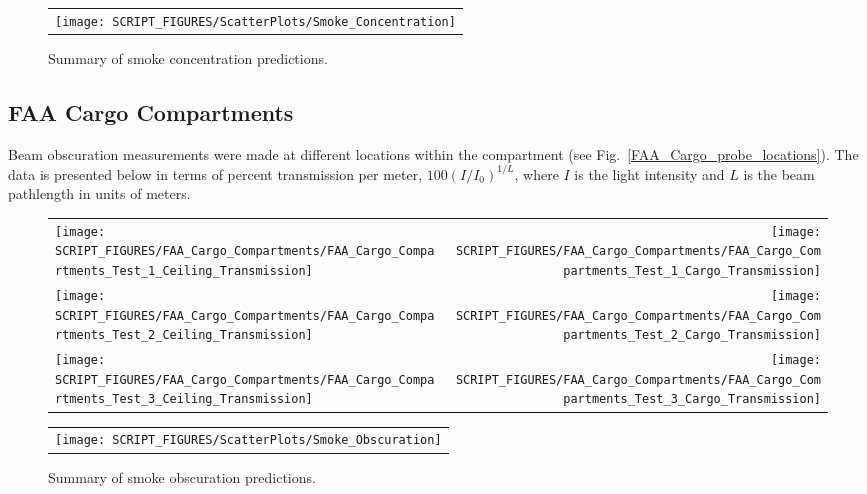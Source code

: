\begin{figure}[p]
\begin{center}
\begin{tabular}{c}
\texttt{[image: SCRIPT\_FIGURES/ScatterPlots/Smoke\_Concentration]}
\end{tabular}
\end{center}
\caption[Summary of smoke concentration predictions]{Summary of smoke concentration predictions.}
\end{figure}

\clearpage

\subsection{FAA Cargo Compartments}

Beam obscuration measurements were made at different locations within the compartment (see Fig.~\ref{FAA_Cargo_probe_locations}). The data is presented below in terms of percent transmission per meter, $100(I/I_0)^{1/L}$, where $I$ is the light intensity and $L$ is the beam pathlength in units of meters.

\begin{figure}[h!]
\begin{tabular*}{\textwidth}{l@{\extracolsep{\fill}}r}
\texttt{[image: SCRIPT\_FIGURES/FAA\_Cargo\_Compartments/FAA\_Cargo\_Compartments\_Test\_1\_Ceiling\_Transmission]} &
\texttt{[image: SCRIPT\_FIGURES/FAA\_Cargo\_Compartments/FAA\_Cargo\_Compartments\_Test\_1\_Cargo\_Transmission]} \\
\texttt{[image: SCRIPT\_FIGURES/FAA\_Cargo\_Compartments/FAA\_Cargo\_Compartments\_Test\_2\_Ceiling\_Transmission]} &
\texttt{[image: SCRIPT\_FIGURES/FAA\_Cargo\_Compartments/FAA\_Cargo\_Compartments\_Test\_2\_Cargo\_Transmission]} \\
\texttt{[image: SCRIPT\_FIGURES/FAA\_Cargo\_Compartments/FAA\_Cargo\_Compartments\_Test\_3\_Ceiling\_Transmission]} &
\texttt{[image: SCRIPT\_FIGURES/FAA\_Cargo\_Compartments/FAA\_Cargo\_Compartments\_Test\_3\_Cargo\_Transmission]}
\end{tabular*}
\end{figure}

\newpage

\begin{figure}[p]
\begin{center}
\begin{tabular}{c}
\texttt{[image: SCRIPT\_FIGURES/ScatterPlots/Smoke\_Obscuration]}
\end{tabular}
\end{center}
\caption[Summary of smoke obscuration predictions]{Summary of smoke obscuration predictions.}
\end{figure}


